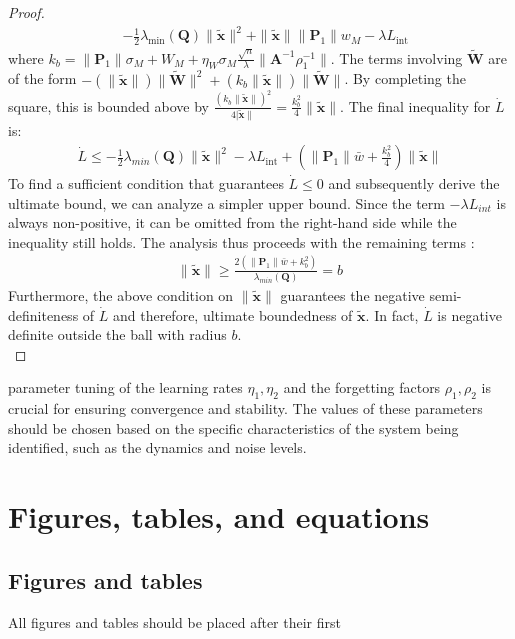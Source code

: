 \documentclass[10pt,twocolumn]{ICCAS}
\newcommand{\xtilde}{\tilde{\bm{x}}}
\newcommand{\Wtilde}{\tilde{\mathbf{W}}}
\begin{document}
\begin{proof}
\begin{align*}
    & - \frac{1}{2}\lambda_{\min}(\mathbf{Q})\|\xtilde\|^2 
    + \|\xtilde\|\|\mathbf{P}_1\|w_M 
    - \lambda L_{\text{int}}
\end{align*}
where $k_b = \|\mathbf{P}_1\|\sigma_M + W_M + \eta_W\sigma_M \frac{\sqrt{n}}{\lambda} \|\mathbf{A}^{-1}\rho_1^{-1}\|$. The terms involving $\Wtilde$ are of the form $-(\|\xtilde\|)\|\Wtilde\|^2 + (k_b\|\xtilde\|)\|\Wtilde\|$. By completing the square, this is bounded above by $\frac{(k_b\|\xtilde\|)^2}{4|\xtilde\|} = \frac{k_b^2}{4}\|\xtilde\|$.
The final inequality for $\dot{L}$ is:
\begin{align}
    \dot{L} \le -\frac{1}{2}\lambda_{min}(\mathbf{Q})\|\xtilde\|^2 - \lambda L_{\text{int}}+ \left( \|\mathbf{P}_1\|\bar{w} + \frac{k_b^2}{4} \right)\|\xtilde\|
\end{align}
To find a sufficient condition that guarantees $\dot{L} \le 0$ and subsequently derive the ultimate bound, we can analyze a simpler upper bound. Since the term $-\lambda L_{int}$ is always non-positive, it can be omitted from the right-hand side while the inequality still holds. The analysis thus proceeds with the remaining terms :
\begin{align}
    \|\xtilde\|\ge\frac{2\left( \|\mathbf{P}_1\|\bar{w} + k_b^2 \right)}{\lambda_{min}(\mathbf{Q})}=b
\end{align}
Furthermore, the above condition on $\|\xtilde\|$ guarantees the negative semi-definiteness of $\dot{L}$ and therefore, ultimate boundedness of $\xtilde$.
In fact, $\dot{L}$ is negative definite outside the ball with radius $b$.\\ 

\end{proof}


parameter tuning of the learning rates $\eta_1, \eta_2$ and the forgetting factors $\rho_1, \rho_2$ is crucial for ensuring convergence and stability. The values of these parameters should be chosen based on the specific characteristics of the system being identified, such as the dynamics and noise levels.


\section{Figures, tables, and equations}

\subsection{Figures and tables}
All figures and tables should be placed after their first 
\end{document}
